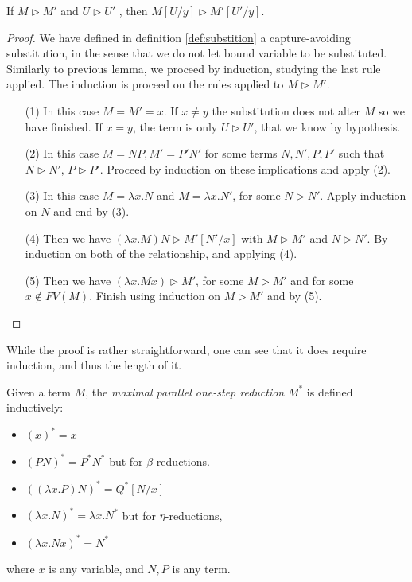 \begin{lemma}If $M \triangleright M'$ and $U \triangleright U'$ , then $M [U/y] \triangleright M' [U' /y]$.\label{lemma:overconstrains}
\end{lemma}
\begin{proof}
  We have defined in definition \ref{def:substition} a capture-avoiding substitution, in the sense that we do not let bound variable to be substituted. Similarly to previous lemma, we proceed by induction, studying the last rule applied. The induction is proceed on the rules applied to $M\triangleright M'$.

  \begin{itemize}
  \item[(1)] In this case $M=M'=x$. If $x\ne y$ the substitution does not alter $M$ so we have finished. If $x = y$, the term is only $U\triangleright U'$, that we know by hypothesis.
  \item[(2)] In this case $M=NP, M'=P'N'$ for some terms $N,N',P,P'$ such that $N\triangleright N'$, $P\triangleright P'$. Proceed by induction on these implications and apply (2).
  \item[(3)] In this case $M=\lambda x.N$ and $M=\lambda x.N'$, for some $N\triangleright N'$. Apply induction on $N$ and end by (3).
  \item[(4)] Then we have $(\lambda x.M)N \triangleright M'[N'/x]$ with $M \triangleright M'$ and $N \triangleright N'$. By induction on both of the relationship, and applying (4).
  \item[(5)] Then we have $(\lambda x.Mx) \triangleright M'$, for some $M\triangleright M'$ and for some $x \not  \in FV(M)$. Finish using induction on $M\triangleright M'$ and by (5).
  \end{itemize}
\end{proof}

While the proof is rather straightforward, one can see that it does require induction, and thus the length of it. 

\begin{definition}
  Given a term $M$, the \emph{maximal parallel one-step reduction} $M^*$ is defined inductively:
  \begin{itemize}
  \item $(x)^*  =x$ 
  \item $(PN)^*=P^*N^*$ but for $\beta$-reductions.
  \item $((\lambda x.P)N)^* = Q^*[N/x] $
  \item $(\lambda x.N)^*=\lambda x.N^*$ but for $\eta$-reductions, 
  \item $(\lambda x.Nx)^*=N^*$ 
  \end{itemize}
  where $x$ is any variable, and $N,P$ is any term.
\end{definition}


